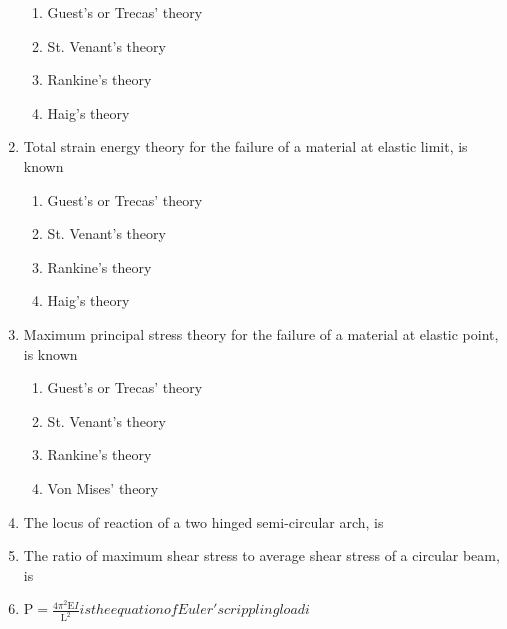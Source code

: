 \documentclass[11pt,a4paper]{article}
\begin{document}
\begin{enumerate}
\begin{enumerate}[label=\Alph*.]
\item{Guest's or Trecas' theory}
\item{St. Venant's theory}
\item{Rankine's theory}
\item{Haig's theory}
\end{enumerate}
\item{Total strain energy theory for the failure of a material at elastic limit, is known}
\begin{enumerate}[label=\Alph*.]
\item{Guest's or Trecas' theory}
\item{St. Venant's theory}
\item{Rankine's theory}
\item{Haig's theory}
\end{enumerate}
\item{Maximum principal stress theory for the failure of a material at elastic point, is known}
\begin{enumerate}[label=\Alph*.]
\item{Guest's or Trecas' theory}
\item{St. Venant's theory}
\item{Rankine's theory}
\item{Von Mises' theory}
\end{enumerate}
\item{The locus of reaction of a two hinged semi-circular arch, is}
\\
\item{The ratio of maximum shear stress to average shear stress of a circular beam, is}
\\
\item{$ {\text{P}} = \frac{{4{\pi ^2}{\text{E}}I}}{{{{\text{L}}^2}}}$$   is the equation of Euler's crippling load i $}

\end{enumerate}
\end{document}
